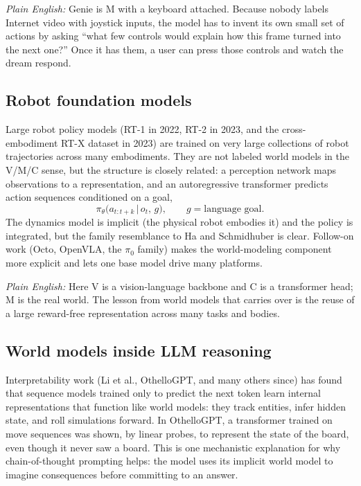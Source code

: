 \documentclass[11pt]{article}
\newcommand{\given}{\,\vert\,}
\theoremstyle{remark}
\newcommand{\plain}[1]{\medskip\noindent\textit{Plain English:} #1\medskip}
\begin{document}
\plain{Genie is M with a keyboard attached. Because nobody labels Internet video with joystick inputs, the model has to invent its own small set of actions by asking ``what few controls would explain how this frame turned into the next one?'' Once it has them, a user can press those controls and watch the dream respond.}

\subsection{Robot foundation models}

Large robot policy models (RT-1 in 2022, RT-2 in 2023, and the cross-embodiment RT-X dataset in 2023) are trained on very large collections of robot trajectories across many embodiments. They are not labeled world models in the V/M/C sense, but the structure is closely related: a perception network maps observations to a representation, and an autoregressive transformer predicts action sequences conditioned on a goal,
\begin{equation}
  \pi_\theta\big(a_{t:t+k} \given o_t,\, g\big), \qquad g = \text{language goal}.
  \label{eq:vla}
\end{equation}
The dynamics model is implicit (the physical robot embodies it) and the policy is integrated, but the family resemblance to Ha and Schmidhuber is clear. Follow-on work (Octo, OpenVLA, the $\pi_0$ family) makes the world-modeling component more explicit and lets one base model drive many platforms.

\plain{Here V is a vision-language backbone and C is a transformer head; M is the real world. The lesson from world models that carries over is the reuse of a large reward-free representation across many tasks and bodies.}

\subsection{World models inside LLM reasoning}

Interpretability work (Li et al., OthelloGPT, and many others since) has found that sequence models trained only to predict the next token learn internal representations that function like world models: they track entities, infer hidden state, and roll simulations forward. In OthelloGPT, a transformer trained on move sequences was shown, by linear probes, to represent the state of the board, even though it never saw a board. This is one mechanistic explanation for why chain-of-thought prompting helps: the model uses its implicit world model to imagine consequences before committing to an answer.
\end{document}
